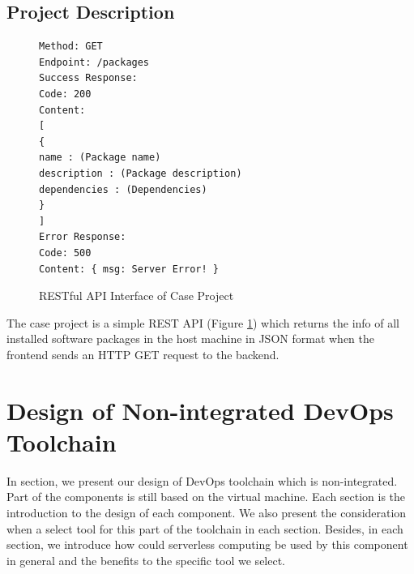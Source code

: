 \subsection{Project Description}
\begin{figure}[!h]
\begin{verbatim}
Method: GET
Endpoint: /packages
Success Response:
Code: 200
Content:
[
{
name : (Package name)
description : (Package description)
dependencies : (Dependencies)
}
]
Error Response:
Code: 500
Content: { msg: Server Error! }
\end{verbatim}
\label{fig:rest}
\caption{RESTful API Interface of Case Project}
\end{figure}
The case project is a simple REST API (Figure \ref{fig:rest}) which returns the info of all installed software packages in the host machine in JSON format when the frontend sends an HTTP GET request to the backend.
\section{Design of Non-integrated DevOps Toolchain}
In section, we present our design of DevOps toolchain which is non-integrated. Part of the components is still based on the virtual machine. Each section is the introduction to the design of each component. We also present the consideration when a select tool for this part of the toolchain in each section. Besides, in each section, we introduce how could serverless computing be used by this component in general and the benefits to the specific tool we select.
